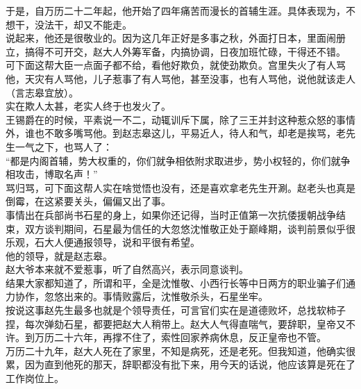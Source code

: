 \begin{multicols}{\theparacolNo}
于是，自万历二十二年起，他开始了四年痛苦而漫长的首辅生涯。具体表现为，不想干，没法干，却又不能走。\\

说起来，他还是很敬业的。因为这几年正好是多事之秋，外面打日本，里面闹册立，搞得不可开交，赵大人外筹军备，内搞协调，日夜加班忙碌，干得还不错。\\

可下面这帮大臣一点面子都不给，看他好欺负，就使劲欺负。宫里失火了有人骂他，天灾有人骂他，儿子惹事了有人骂他，甚至没事，也有人骂他，说他就该走人（言志皋宜放）。\\

实在欺人太甚，老实人终于也发火了。\\

王锡爵在的时候，平素说一不二，动辄训斥下属，除了三王并封这种惹众怒的事情外，谁也不敢多嘴骂他。到赵志皋这儿，平易近人，待人和气，却老是挨骂，老先生一气之下，也骂人了：\\

“都是内阁首辅，势大权重的，你们就争相依附求取进步，势小权轻的，你们就争相攻击，博取名声！”\\

骂归骂，可下面这帮人实在啥觉悟也没有，还是喜欢拿老先生开涮。赵老头也真是倒霉，在这紧要关头，偏偏又出了事。\\

事情出在兵部尚书石星的身上，如果你还记得，当时正值第一次抗倭援朝战争结束，双方谈判期间，石星最为信任的大忽悠沈惟敬正处于巅峰期，谈判前景似乎很乐观，石大人便通报领导，说和平很有希望。\\

他的领导，就是赵志皋。\\

赵大爷本来就不爱惹事，听了自然高兴，表示同意谈判。\\

结果大家都知道了，所谓和平，全是沈惟敬、小西行长等中日两方的职业骗子们通力协作，忽悠出来的。事情败露后，沈惟敬杀头，石星坐牢。\\

按说这事赵先生最多也就是个领导责任，可言官们实在是道德败坏，总找软柿子捏，每次弹劾石星，都要把赵大人稍带上。赵大人气得直喘气，要辞职，皇帝又不许。到万历二十六年，再撑不住了，索性回家养病休息，反正皇帝也不管。\\

万历二十九年，赵大人死在了家里，不知是病死，还是老死。但我知道，他确实很累，因为直到他死的那天，辞职都没有批下来，用今天的话说，他应该算是死在了工作岗位上。\\


\end{multicols}
